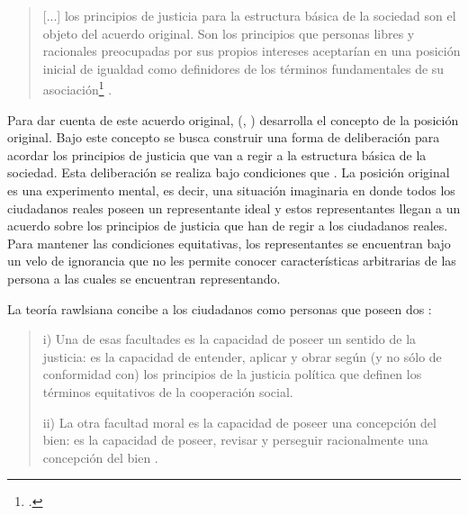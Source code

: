 \vspace{3mm}
\begin{quote}
    [...] los principios de justicia para la estructura básica de la sociedad son el objeto del acuerdo original. Son los principios que personas libres y racionales preocupadas por sus propios intereses aceptarían en una posición inicial de igualdad como definidores de los términos fundamentales de su asociación\footnote{ \citep[p. 11]{Rawls_1971}.} \citep[p. 11]{Rawls_1971}.
\end{quote}
\vspace{3mm}

Para dar cuenta de este acuerdo original, \citeauthor{Rawls_1971} (\citeyear{Rawls_1971}, \citeyear{Rawls_2002}) desarrolla el concepto de la posición original. Bajo este concepto se busca construir una forma de deliberación para acordar los principios de justicia que van a regir a la estructura básica de la sociedad. Esta deliberación se realiza bajo condiciones que   \citep[p. 39]{Rawls_2002}. La posición original es una experimento mental, es decir, una situación imaginaria en donde todos los ciudadanos reales poseen un representante ideal y estos representantes llegan a un acuerdo sobre los principios de justicia que han de regir a los ciudadanos reales. Para mantener las condiciones equitativas, los representantes se encuentran bajo un velo de ignorancia que no les permite conocer características arbitrarias de las persona a las cuales se encuentran representando.


La teoría rawlsiana concibe a los ciudadanos como personas que poseen dos :

\vspace{3mm}
\begin{quote}
    i) Una de esas facultades es la capacidad de poseer un sentido de la justicia: es la capacidad de entender, aplicar y obrar según (y no sólo de conformidad con) los principios de la justicia política que definen los términos equitativos de la cooperación social.
    
    ii) La otra facultad moral es la capacidad de poseer una concepción del bien: es la capacidad de poseer, revisar y perseguir racionalmente una concepción del bien \citep[p. 43]{Rawls_2002}.
\end{quote}
\vspace{3mm}

